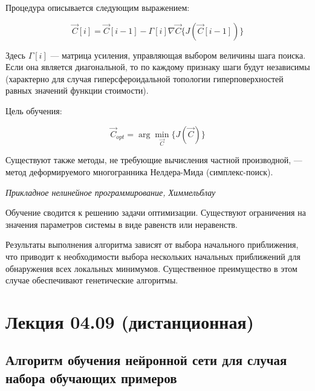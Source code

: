 \documentclass{article}
\numberwithin{equation}{subsection}
\begin{document}
Процедура описывается следующим выражением:

\begin{equation}
    \vec{C}[i] = \vec{C}[i-1] - \Gamma[i] \nabla\vec{C} \{ J(\vec{C}[i-1]) \}
\end{equation}

Здесь $\Gamma[i]$ --- матрица усиления, управляющая выбором величины шага поиска.
Если она является диагональной, то по каждому признаку шаги будут независимы 
(характерно для случая гиперсфероидальной топологии гиперповерхностей равных
значений функции стоимости).

Цель обучения: 

\begin{equation}
    \vec{C}_{opt} = \arg \min_{\vec{C}} \{ J(\vec{C}) \}
\end{equation}

Существуют также методы, не требующие вычисления частной производной, ---
 метод деформируемого многогранника Нелдера-Мида (симплекс-поиск).

\begin{myquote}
    \textit{Прикладное нелинейное программирование, Химмельблау}
\end{myquote}

Обучение сводится к решению задачи оптимизации. Существуют ограничения на значения параметров 
системы в виде равенств или неравенств.

Результаты выполнения алгоритма зависят от выбора начального приближения, что приводит 
к необходимости выбора нескольких начальных приближений для обнаружения всех локальных 
минимумов. Существенное преимущество в этом случае обеспечивают генетические алгоритмы.




\section{Лекция 04.09 (дистанционная)}

\subsection{Алгоритм обучения нейронной сети для случая набора обучающих примеров}
\end{document}
